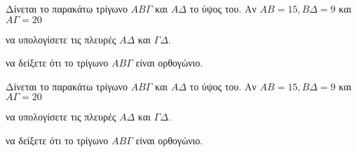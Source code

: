 Δίνεται το παρακάτω τρίγωνο $ AB\varGamma $ και $ A\varDelta $ το ύψος του. Αν $ AB=15,Β\varDelta=9 $ και $ A\varGamma=20 $
\begin{alist}
\item να υπολογίσετε τις πλευρές $ A\varDelta $ και $ \varGamma\varDelta $.
\item να δείξετε ότι το τρίγωνο $ AB\varGamma $ είναι ορθογώνιο.
\end{alist}
Δίνεται το παρακάτω τρίγωνο $ AB\varGamma $ και $ A\varDelta $ το ύψος του. Αν $ AB=15,Β\varDelta=9 $ και $ A\varGamma=20 $
\begin{alist}
\item να υπολογίσετε τις πλευρές $ A\varDelta $ και $ \varGamma\varDelta $.
\item να δείξετε ότι το τρίγωνο $ AB\varGamma $ είναι ορθογώνιο.
\end{alist}
